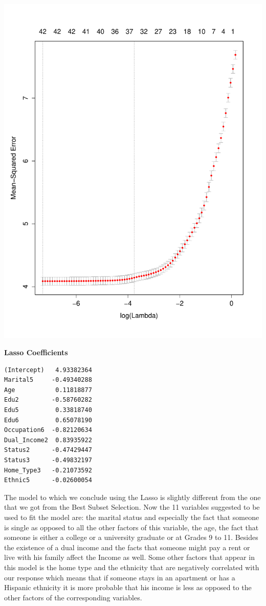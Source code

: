 \documentclass{article}
\begin{document}
\begin{center}
\begin{minipage}[c]{0.4\textwidth}
\includegraphics[width = \textwidth]{LASSO_ERROR_PLOT.pdf}
\end{minipage}\quad\quad\quad
\begin{minipage}[c]{0.4\textwidth}
\textbf{Lasso Coefficients}
{\small
\begin{verbatim}
(Intercept)   4.93382364      
Marital5     -0.49340288
Age           0.11818877
Edu2         -0.58760282      
Edu5          0.33818740
Edu6          0.65078190       
Occupation6  -0.82120634    
Dual_Income2  0.83935922     
Status2      -0.47429447
Status3      -0.49832197       
Home_Type3   -0.21073592      
Ethnic5      -0.02600054
\end{verbatim}
}
\end{minipage}
\end{center}
The model to which we conclude using the Lasso is slightly different from the one that we got from the Best Subset Selection. Now the 11 variables suggested to be used to fit the model are: the marital status and especially the fact that someone is single as opposed to all the other factors of this variable, the age, the fact that someone is either a college or a university graduate or at Grades 9 to 11. Besides the existence of a dual income and the facts that someone might pay a rent or live with his family affect the Income as well. Some other factors that appear in this model is the home type and the ethnicity that are negatively correlated with our response which means that if someone stays in an apartment or has a Hispanic ethnicity it is more probable that his income is less as opposed to the other factors of the corresponding variables.
\end{document}
